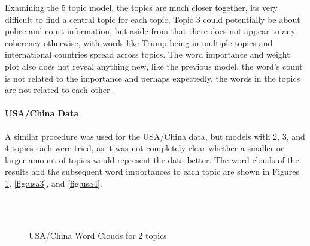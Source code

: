 Examining the 5 topic model, the topics are much closer together, its very difficult to find a central topic for each topic, Topic 3 could potentially be about police and court information, but aside from that there does not appear to any coherency otherwise, with words like Trump being in multiple topics and international countries spread across topics. The word importance and weight plot also does not reveal anything new, like the previous model, the word's count is not related to the importance and perhaps expectedly, the words in the topics are not related to each other.

\paragraph{USA/China Data}
A similar procedure was used for the USA/China data, but models with 2, 3, and 4 topics each were tried, as it was not completely clear whether a smaller or larger amount of topics would represent the data better. The word clouds of the results and the subsequent word importances to each topic are shown in Figures \ref{fig:usa2}, \ref{fig:usa3}, and \ref{fig:usa4}. 
\begin{figure}[H]
	\centering
	\\
	\\
	
	\caption{USA/China Word Clouds for 2 topics}
	\label{fig:usa2}
\end{figure}
